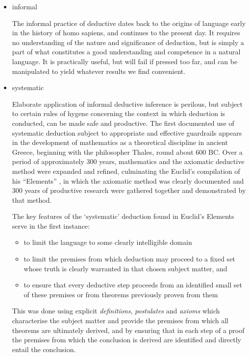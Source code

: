 \documentclass[10pt,titlepage]{book}
\begin{document}
\begin{itemize}
\item informal
  
  The informal practice of deductive dates back to the origins of language early in the history of homo sapiens, and continues to the present day.
  It requires no understanding of the nature and significance of deduction, but is simply a part of what constitutes a good understanding and competence in a natural language.
  It is practically useful, but will fail if pressed too far, and can be manipulated to yield whatever results we find convenient.
  
\item systematic

  Elaborate application of informal deductive inference is perilous, but subject to certain rules of hygene concerning the context in which deduction is conducted, can be made safe and productive.
  The first documented use of systematic deduction subject to appropriate and effective guardrails appears in the development of mathematics as a theoretical discipline in ancient Greece, beginning with the philosopher Thales, round about 600 BC.
  Over a period of approximately 300 years, mathematics and the axiomatic deductive method were expanded and refined, culminating the Euclid's compilation of his ``Elements'' \cite{euclidEL1}, in which the axiomatic method was clearly documented and 300 years of productive research were gathered together and demonstrated by that method.

  The key features of the `systematic' deduction found in Euclid's Elements serve in the first instance:
  \begin{itemize}
  \item to limit the language to some clearly intelligible domain
  \item to limit the premises from which deduction may proceed to a fixed set whose truth is clearly warranted in that chosen subject matter, and
    \item to ensure that every deductive step proceeds from an identified small set of these premises or from theorems previously proven from them
  \end{itemize}
  This was done using explicit \emph{definitions}, \emph{postulates} and \emph{axioms} which characterise the subject matter and provide the premises from which all theorems are ultimately derived, and by ensuring that in each step of a proof the premises from which the conclusion is derived are identified and directly entail the conclusion.


\end{itemize}
\end{document}
